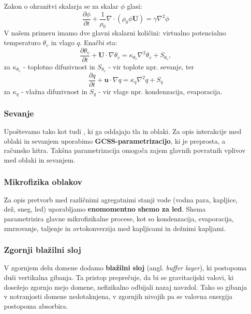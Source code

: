 \documentclass[mat2, tisk]{fmfdelo}
\begin{document}
Zakon o ohranitvi skalarja se za skalar $\phi$ glasi:
\begin{equation}
\frac{\partial \phi}{\partial t} + \frac{1}{\rho_0}\nabla \cdot (\rho_0 \phi\textbf{U}) = \gamma \nabla^2 \phi
\end{equation}
V našem primeru imamo dve glavni skalarni količini: virtualno potencialno
temperaturo $\theta_v$ in vlago $q$. Enačbi sta: 
\begin{equation}
  \frac{\partial \theta_v}{\partial t} + \mathbf{U}\cdot\nabla \theta_v
   = \kappa_{\theta_v} \nabla^2 \theta_v + S_{\theta_v}, 
\end{equation}
za $\kappa_{\theta_v}$ - toplotno difuzivnost in $S_{\theta_v}$ - vir toplote npr. sevanje, 
ter 
\begin{equation}
  \frac{\partial q}{\partial t} + \mathbf{u}\cdot\nabla q
   = \kappa_q \nabla^2 q + S_q
\end{equation}
za $\kappa_q$ - vlažna difuzivnost in $S_q$ - vir vlage npr. kondenzacija, evaporacija.

\subsubsection{Sevanje}

Upoštevamo tako  kot tudi , ki ga oddajajo tla in oblaki. 
Za opis interakcije med oblaki in sevanjem uporabimo \textbf{GCSS-parametrizacijo}\cite{krueger2016gcss}, ki je preprosta, a računsko hitra. 
Takšna parametrizacija omogoča zajem glavnih povratnih vplivov med oblaki in sevanjem.

\subsubsection{Mikrofizika oblakov}

Za opis pretvorb med različnimi agregatnimi stanji vode 
(vodna para, kapljice, dež, sneg, led) uporabljamo 
\textbf{enomomentno shemo za led}\cite{tomita2008microphysics}. Shema parametrizira glavne 
mikrofizikalne procese, kot so kondenzacija, evaporacija, zmrzovanje, 
taljenje in avtokonverzija med kapljicami in dežnimi kapljami.

\subsubsection{Zgornji blažilni sloj}

V zgornjem delu domene dodamo \textbf{blažilni sloj} (angl. \emph{buffer layer}),
ki postopoma duši vertikalna gibanja. Ta pristop preprečuje, da bi se 
gravitacijski valovi, ki dosežejo zgornjo mejo domene, nefizikalno 
odbijali nazaj navzdol. Tako so gibanja v notranjosti domene 
nedotaknjena, v zgornjih nivojih pa se valovna energija postopoma 
absorbira.
\end{document}
